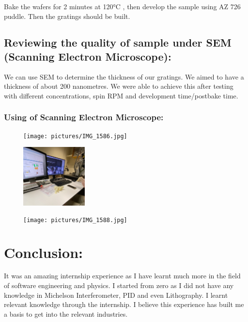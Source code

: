 \documentclass{article}
\begin{document}
Bake the wafers for 2 minutes at 120°C , then develop the sample using AZ 726 puddle. Then the gratings should be built.


\subsection{Reviewing the quality of sample under SEM (Scanning Electron Microscope):}

We can use SEM to determine the thickness of our gratings. We aimed to have a thickness of about 200 nanometres. We were able to achieve this after testing with different concentrations, spin RPM and development time/postbake time.

\subsubsection{Using of Scanning Electron Microscope:}

\begin{figure}[H]
\centering
\texttt{[image: pictures/IMG\_1586.jpg]}

\includegraphics[width=0.3\textwidth,angle=0,origin=c]{pictures/IMG_1585.jpg}

\texttt{[image: pictures/IMG\_1588.jpg]}

\end{figure}



\section{Conclusion:}

It was an amazing internship experience as I have learnt much more in the field of software engineering and physics. I started from zero as I did not have any knowledge in Michelson Interferometer, PID and even Lithography. I learnt relevant knowledge through the internship. I believe this experience has built me a basis to get into the relevant industries.
\end{document}
